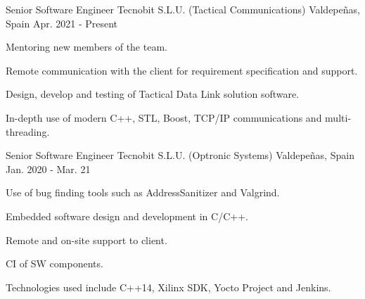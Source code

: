 

\begin{cventries}

  \cventry
    {Senior Software Engineer} %
    {Tecnobit S.L.U. (Tactical Communications)} %
    {Valdepeñas, Spain} %
    {Apr. 2021 - Present} %
    {
      \begin{cvitems} %
        \item {Mentoring new members of the team.}
        \item {Remote communication with the client for requirement specification and support.}
        \item {Design, develop and testing of Tactical Data Link solution software.}
        \item {In-depth use of modern C++, STL, Boost, TCP/IP communications and multi-threading.}
      \end{cvitems}
    }

  \cventry
    {Senior Software Engineer} %
    {Tecnobit S.L.U. (Optronic Systems)} %
    {Valdepeñas, Spain} %
    {Jan. 2020 - Mar. 21} %
    {
      \begin{cvitems} %
        \item {Use of bug finding tools such as AddressSanitizer and Valgrind. }
        \item {Embedded software design and development in C/C++.}
        \item {Remote and on-site support to client.}
        \item {CI of SW components.}
        \item {Technologies used include C++14, Xilinx SDK, Yocto Project and Jenkins.}
      \end{cvitems}
    }


\end{cventries}
